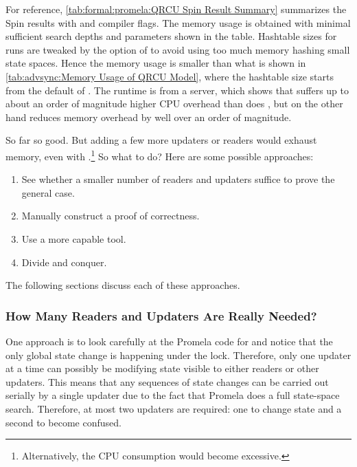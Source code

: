 For reference, \cref{tab:formal:promela:QRCU Spin Result Summary}
summarizes the Spin results with  and 
compiler flags.
The memory usage is obtained with minimal sufficient
search depths and  parameters shown in the table.
Hashtable sizes for  runs are tweaked by
the  option of  to avoid using too much
memory hashing small state spaces.
Hence the memory usage is smaller than what is shown in
\cref{tab:advsync:Memory Usage of QRCU Model}, where the
hashtable size starts from the default of .
The runtime is from a  server, which shows that 
suffers up to about an order of magnitude higher CPU overhead
than does , but on the other hand reduces memory overhead
by well over an order of magnitude.

So far so good.
But adding a few more updaters or readers would exhaust memory, even
with .\footnote{
	Alternatively, the CPU consumption would become excessive.}
So what to do?
Here are some possible approaches:

\begin{enumerate}
\item	See whether a smaller number of readers and updaters suffice
	to prove the general case.
\item	Manually construct a proof of correctness.
\item	Use a more capable tool.
\item	Divide and conquer.
\end{enumerate}

The following sections discuss each of these approaches.

\subsubsection{How Many Readers and Updaters Are Really Needed?}
\label{sec:formal:How Many Readers and Updaters Are Really Needed?}

One approach is to look carefully at the Promela code for
 and notice that the only global state
change is happening under the lock.
Therefore, only one updater at a time can possibly be modifying
state visible to either readers or other updaters.
This means that any sequences of state changes can be carried
out serially by a single updater due to the fact that Promela does a full
state-space search.
Therefore, at most two updaters are required: one to change state
and a second to become confused.

